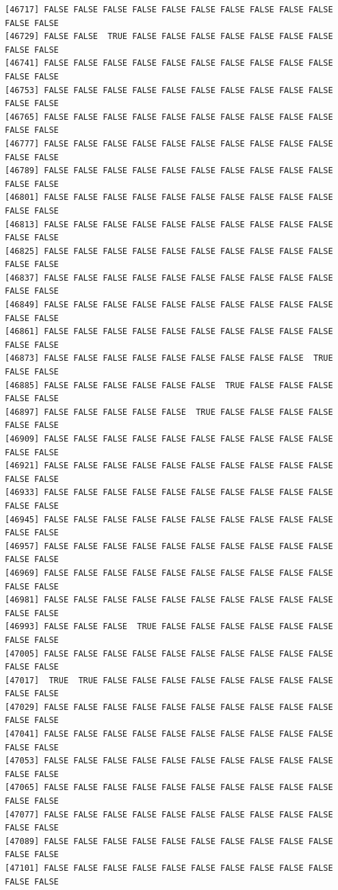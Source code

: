 \documentclass[
  a4paper,
  DIV=11,
  numbers=noendperiod]{scrartcl}
\begin{document}
\begin{verbatim}
[46717] FALSE FALSE FALSE FALSE FALSE FALSE FALSE FALSE FALSE FALSE FALSE FALSE
[46729] FALSE FALSE  TRUE FALSE FALSE FALSE FALSE FALSE FALSE FALSE FALSE FALSE
[46741] FALSE FALSE FALSE FALSE FALSE FALSE FALSE FALSE FALSE FALSE FALSE FALSE
[46753] FALSE FALSE FALSE FALSE FALSE FALSE FALSE FALSE FALSE FALSE FALSE FALSE
[46765] FALSE FALSE FALSE FALSE FALSE FALSE FALSE FALSE FALSE FALSE FALSE FALSE
[46777] FALSE FALSE FALSE FALSE FALSE FALSE FALSE FALSE FALSE FALSE FALSE FALSE
[46789] FALSE FALSE FALSE FALSE FALSE FALSE FALSE FALSE FALSE FALSE FALSE FALSE
[46801] FALSE FALSE FALSE FALSE FALSE FALSE FALSE FALSE FALSE FALSE FALSE FALSE
[46813] FALSE FALSE FALSE FALSE FALSE FALSE FALSE FALSE FALSE FALSE FALSE FALSE
[46825] FALSE FALSE FALSE FALSE FALSE FALSE FALSE FALSE FALSE FALSE FALSE FALSE
[46837] FALSE FALSE FALSE FALSE FALSE FALSE FALSE FALSE FALSE FALSE FALSE FALSE
[46849] FALSE FALSE FALSE FALSE FALSE FALSE FALSE FALSE FALSE FALSE FALSE FALSE
[46861] FALSE FALSE FALSE FALSE FALSE FALSE FALSE FALSE FALSE FALSE FALSE FALSE
[46873] FALSE FALSE FALSE FALSE FALSE FALSE FALSE FALSE FALSE  TRUE FALSE FALSE
[46885] FALSE FALSE FALSE FALSE FALSE FALSE  TRUE FALSE FALSE FALSE FALSE FALSE
[46897] FALSE FALSE FALSE FALSE FALSE  TRUE FALSE FALSE FALSE FALSE FALSE FALSE
[46909] FALSE FALSE FALSE FALSE FALSE FALSE FALSE FALSE FALSE FALSE FALSE FALSE
[46921] FALSE FALSE FALSE FALSE FALSE FALSE FALSE FALSE FALSE FALSE FALSE FALSE
[46933] FALSE FALSE FALSE FALSE FALSE FALSE FALSE FALSE FALSE FALSE FALSE FALSE
[46945] FALSE FALSE FALSE FALSE FALSE FALSE FALSE FALSE FALSE FALSE FALSE FALSE
[46957] FALSE FALSE FALSE FALSE FALSE FALSE FALSE FALSE FALSE FALSE FALSE FALSE
[46969] FALSE FALSE FALSE FALSE FALSE FALSE FALSE FALSE FALSE FALSE FALSE FALSE
[46981] FALSE FALSE FALSE FALSE FALSE FALSE FALSE FALSE FALSE FALSE FALSE FALSE
[46993] FALSE FALSE FALSE  TRUE FALSE FALSE FALSE FALSE FALSE FALSE FALSE FALSE
[47005] FALSE FALSE FALSE FALSE FALSE FALSE FALSE FALSE FALSE FALSE FALSE FALSE
[47017]  TRUE  TRUE FALSE FALSE FALSE FALSE FALSE FALSE FALSE FALSE FALSE FALSE
[47029] FALSE FALSE FALSE FALSE FALSE FALSE FALSE FALSE FALSE FALSE FALSE FALSE
[47041] FALSE FALSE FALSE FALSE FALSE FALSE FALSE FALSE FALSE FALSE FALSE FALSE
[47053] FALSE FALSE FALSE FALSE FALSE FALSE FALSE FALSE FALSE FALSE FALSE FALSE
[47065] FALSE FALSE FALSE FALSE FALSE FALSE FALSE FALSE FALSE FALSE FALSE FALSE
[47077] FALSE FALSE FALSE FALSE FALSE FALSE FALSE FALSE FALSE FALSE FALSE FALSE
[47089] FALSE FALSE FALSE FALSE FALSE FALSE FALSE FALSE FALSE FALSE FALSE FALSE
[47101] FALSE FALSE FALSE FALSE FALSE FALSE FALSE FALSE FALSE FALSE FALSE FALSE

\end{verbatim}
\end{document}
